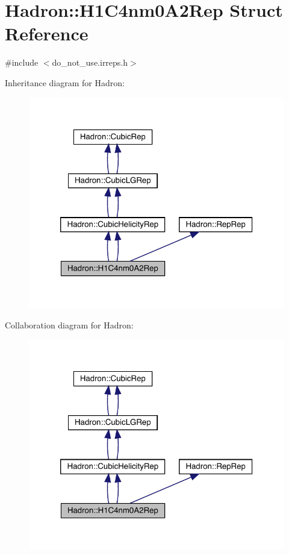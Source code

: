 \hypertarget{structHadron_1_1H1C4nm0A2Rep}{}\section{Hadron\+:\+:H1\+C4nm0\+A2\+Rep Struct Reference}
\label{structHadron_1_1H1C4nm0A2Rep}


{\ttfamily \#include $<$do\+\_\+not\+\_\+use.\+irreps.\+h$>$}



Inheritance diagram for Hadron\+:\nopagebreak
\begin{figure}[H]
\begin{center}
\leavevmode
\includegraphics[width=320pt]{d0/d1e/structHadron_1_1H1C4nm0A2Rep__inherit__graph}
\end{center}
\end{figure}


Collaboration diagram for Hadron\+:\nopagebreak
\begin{figure}[H]
\begin{center}
\leavevmode
\includegraphics[width=320pt]{da/db7/structHadron_1_1H1C4nm0A2Rep__coll__graph}
\end{center}
\end{figure}
